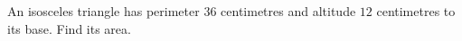 An isosceles triangle has perimeter $36$ centimetres and altitude $12$ centimetres to its base. Find its area.
